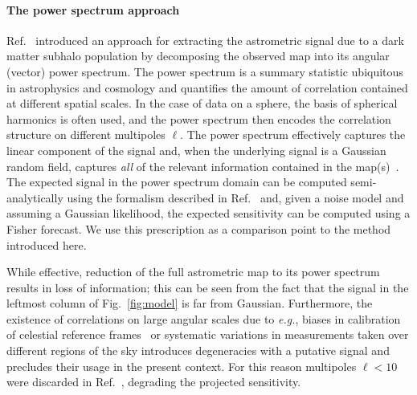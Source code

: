 \documentclass[preprint]{article}
\begin{document}
\paragraph{The power spectrum approach} Ref.~\cite{Mishra-Sharma:2020ynk} introduced an approach for extracting the astrometric signal due to a dark matter subhalo population by decomposing the observed map into its angular (vector) power spectrum. The power spectrum is a summary statistic ubiquitous in astrophysics and cosmology and quantifies the amount of correlation contained at different spatial scales. In the case of data on a sphere, the basis of spherical harmonics is often used, and the power spectrum then encodes the correlation structure on different multipoles $\ell$. The power spectrum effectively captures the linear component of the signal and, when the underlying signal is a Gaussian random field, captures \emph{all} of the relevant information contained in the map(s)~\cite{Tegmark:1996qt}.
The expected signal in the power spectrum domain can be computed semi-analytically using the formalism described in Ref.~\cite{Mishra-Sharma:2020ynk} and, given a noise model and assuming a Gaussian likelihood, the expected sensitivity can be computed using a Fisher forecast. We use this prescription as a comparison point to the method introduced here.

While effective, reduction of the full astrometric map to its power spectrum results in loss of information; this can be seen from the fact that the signal in the leftmost column of Fig.~\ref{fig:model} is far from Gaussian. Furthermore, the existence of correlations on large angular scales due to \emph{e.g.}, biases in calibration of celestial reference frames~\cite{2018A&A...616A..14G} or systematic variations in measurements taken over different regions of the sky introduces degeneracies with a putative signal and precludes their usage in the present context. For this reason multipoles $\ell < 10$ were discarded in Ref.~\cite{Mishra-Sharma:2020ynk}, degrading the projected sensitivity.
\end{document}
